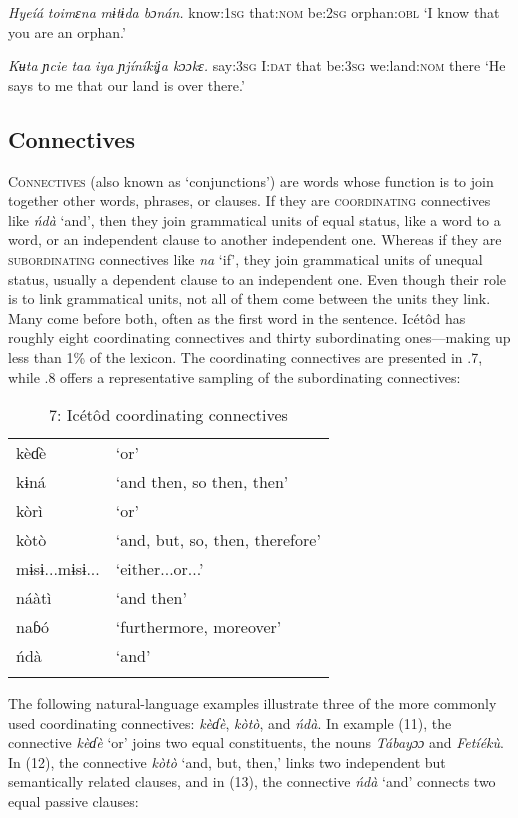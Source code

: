 \textit{Hyeíá   }\textit{toimɛna}\textit{   mɨtɨda   bɔnán.}
know:\textsc{1sg}   that:\textsc{nom}   be:\textsc{2sg}   orphan:\textsc{obl}
‘I know that you are an orphan.’




\textit{Kʉta   ɲcie   }\textit{taa}\textit{   iya     ɲjíníkiʝa    kɔɔkɛ.}
say:\textsc{3sg}   I:\textsc{dat}   that   be:\textsc{3sg}  we:land:\textsc{nom} there
‘He says to me that our land is over there.’






\subsection{Connectives}


\textsc{Connectives} (also known as ‘conjunctions’) are words whose function is to join together other words, phrases, or clauses. If they are \textsc{coordinating} connectives like \textit{ńdà }‘and’, then they join grammatical units of equal status, like a word to a word, or an independent clause to another independent one. Whereas if they are \textsc{subordinating} connectives like \textit{na} ‘if’, they join grammatical units of unequal status, usually a dependent clause to an independent one. Even though their role is to link grammatical units, not all of them come between the units they link. Many come before both, often as the first word in the sentence. Icétôd has roughly eight coordinating connectives and thirty subordinating ones—making up less than 1\% of the lexicon. The coordinating connectives are presented in .7, while .8 offers a representative sampling of the subordinating connectives:


\begin{table}
\caption{7: Icétôd coordinating connectives}
\label{tab:3}


\begin{tabularx}{\textwidth}{XX}
\lsptoprule

kèɗè & ‘or’\\
kɨná & ‘and then, so then, then’\\
kòrì & ‘or’\\
kòtò & ‘and, but, so, then, therefore’\\
mɨsɨ...mɨsɨ... & ‘either...or...’\\
náàtì & ‘and then’\\
naɓó & ‘furthermore, moreover’\\
ńdà & ‘and’\\
\lspbottomrule
\end{tabularx}
\end{table}
The following natural-language examples illustrate three of the more commonly used coordinating connectives: \textit{kèɗè}, \textit{kòtò}, and \textit{ńdà}. In example (11), the connective \textit{kèɗè} ‘or’ joins two equal constituents, the nouns \textit{Tábayɔɔ }and \textit{Fetíékù}. In (12), the connective \textit{kòtò} ‘and, but, then,’ links two independent but semantically related clauses, and in (13), the connective \textit{ńdà }‘and’ connects two equal passive clauses:




